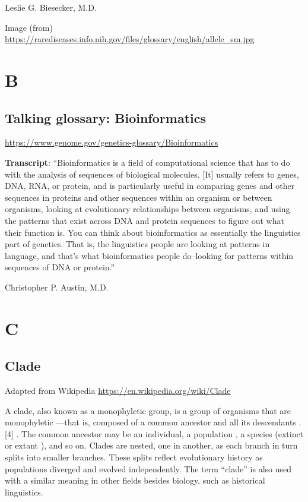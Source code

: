 \documentclass[
]{book}
\begin{document}
Leslie G. Biesecker, M.D.

Image (from)
\url{https://rarediseases.info.nih.gov/files/glossary/english/allele_sm.jpg}

\hypertarget{b}{%
\chapter{B}\label{b}}

\hypertarget{talking-glossary-bioinformatics}{%
\section{Talking glossary: Bioinformatics}\label{talking-glossary-bioinformatics}}

\url{https://www.genome.gov/genetics-glossary/Bioinformatics}

\textbf{Transcript}: ``Bioinformatics is a field of computational science that has to do with the analysis of sequences of biological molecules. {[}It{]} usually refers to genes, DNA, RNA, or protein, and is particularly useful in comparing genes and other sequences in proteins and other sequences within an organism or between organisms, looking at evolutionary relationships between organisms, and using the patterns that exist across DNA and protein sequences to figure out what their function is. You can think about bioinformatics as essentially the linguistics part of genetics. That is, the linguistics people are looking at patterns in language, and that's what bioinformatics people do--looking for patterns within sequences of DNA or protein.''

Christopher P. Austin, M.D.

\hypertarget{c}{%
\chapter{C}\label{c}}

\hypertarget{clade}{%
\section{Clade}\label{clade}}

Adapted from Wikipedia
\url{https://en.wikipedia.org/wiki/Clade}

A clade, also known as a monophyletic group, is a group of organisms that are monophyletic ---that is, composed of a common ancestor and all its descendants .{[}4{]} . The common ancestor may be an individual, a population , a species (extinct or extant ), and so on. Clades are nested, one in another, as each branch in turn splits into smaller branches. These splits reflect evolutionary history as populations diverged and evolved independently. The term ``clade'' is also used with a similar meaning in other fields besides biology, such as historical linguistics.
\end{document}
